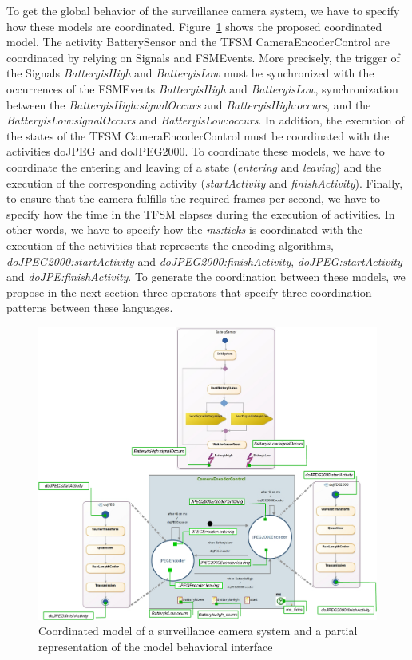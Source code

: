 To get the global behavior of the surveillance camera system, we have to specify how these models are coordinated. Figure~\ref{fig:cameramodel} shows the proposed coordinated model. The activity BatterySensor and the TFSM CameraEncoderControl are coordinated by relying on Signals and FSMEvents. More precisely, the trigger of the Signals \emph{BatteryisHigh} and \emph{BatteryisLow} must be synchronized with the occurrences of the FSMEvents \emph{BatteryisHigh} and \emph{BatteryisLow}, \ie synchronization between the \mse \emph{BatteryisHigh:signalOccurs} and \emph{BatteryisHigh:occurs}, and the \mse \emph{BatteryisLow:signalOccurs} and  \emph{BatteryisLow:occurs}. In addition, the execution of the states of the TFSM CameraEncoderControl must be coordinated with the activities doJPEG and doJPEG2000. To coordinate these models, we have to coordinate the entering and leaving of a state (\ie \dse \emph{entering} and \emph{leaving}) and the execution of the corresponding activity (\ie \dse \emph{startActivity} and \emph{finishActivity}). Finally, to ensure that the camera fulfills the required frames per second, we have to specify how the time in the TFSM elapses during the execution of activities. In other words, we have to specify how the \mse \emph{ms:ticks} is coordinated with the execution of the activities that represents the encoding algorithms, \eg \emph{doJPEG2000:startActivity} and \emph{doJPEG2000:finishActivity}, \emph{doJPEG:startActivity} and \emph{doJPE:finishActivity}. To generate the coordination between these models, we propose in the next section three \bcool operators that specify three coordination patterns between these languages. 

	
	\begin{figure}[h]
		\center
		\includegraphics[width=1\columnwidth]{examples/figs/picmodels.pdf}
		\caption{Coordinated model of a surveillance camera system and a partial representation of the model behavioral interface}
		\label{fig:cameramodel}
	\end{figure}

